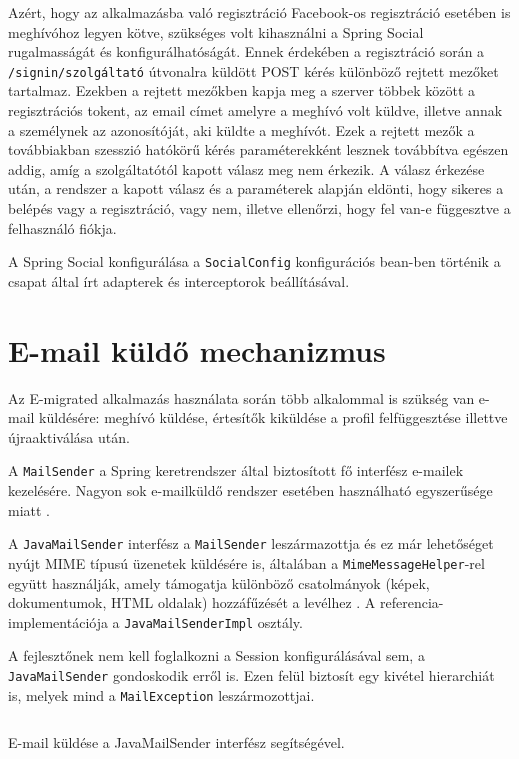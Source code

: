 Azért, hogy az alkalmazásba való regisztráció Facebook-os regisztráció esetében is meghívóhoz legyen kötve, szükséges volt kihasználni a Spring Social rugalmasságát és konfigurálhatóságát. Ennek érdekében a regisztráció során a
 \texttt{/signin/szolgáltató} útvonalra küldött POST kérés különböző rejtett mezőket tartalmaz. Ezekben a rejtett mezőkben kapja meg a szerver többek között a regisztrációs tokent, az email címet amelyre a meghívó volt küldve, illetve annak a személynek az azonosítóját, aki küldte a meghívót. Ezek a rejtett mezők a továbbiakban szesszió hatókörű kérés paraméterekként lesznek továbbítva egészen addig, amíg a szolgáltatótól kapott válasz meg nem érkezik. A válasz érkezése után, a rendszer a kapott válasz és a paraméterek alapján eldönti, hogy sikeres a belépés vagy a regisztráció, vagy nem, illetve ellenőrzi, hogy fel van-e függesztve a felhasználó fiókja. 

A Spring Social konfigurálása a \texttt{SocialConfig} konfigurációs bean-ben történik a csapat által írt adapterek és interceptorok beállításával. 

\section{E-mail küldő mechanizmus}
\label{subsec:e-mail}

Az E-migrated alkalmazás használata során több alkalommal is szükség van e-mail küldésére: meghívó küldése, értesítők kiküldése a profil felfüggesztése illettve újraaktiválása után.

A \texttt{MailSender} a Spring keretrendszer által biztosított fő interfész e-mailek kezelésére. Nagyon sok e-mailküldő rendszer esetében használható egyszerűsége miatt \cite{MailSender}. 

A \texttt{JavaMailSender} interfész a \texttt{MailSender} leszármazottja és ez már lehetőséget nyújt MIME típusú üzenetek küldésére is, általában a \texttt{MimeMessageHelper}-rel együtt használják, amely támogatja különböző csatolmányok (képek, dokumentumok, HTML oldalak) hozzáfűzését a levélhez \cite{JavaMail}. A referencia-implementációja a \texttt{JavaMailSenderImpl} osztály. 

A fejlesztőnek nem kell foglalkozni a Session konfigurálásával sem, a \texttt{JavaMailSender} gondoskodik erről is. Ezen felül biztosít egy kivétel hierarchiát is, melyek mind a \texttt{MailException} leszármozottjai. 

\begin{listing}
  \inputminted[fontsize=\small]{java}{progfiles/SendEmail.java}
  \caption{E-mail küldése a JavaMailSender interfész segítségével.}
  \label{lst:sendEmail}
\end{listing}

